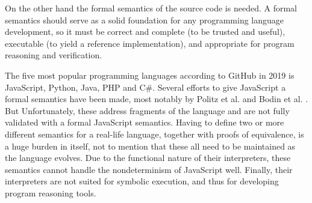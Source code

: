 \begin{multicols*}{2}
	On the other hand the formal semantics of the source code is needed.  A formal semantics should serve as a solid foundation for any programming language development, so it must be correct and complete (to be trusted and useful), executable (to yield a reference implementation), and appropriate for program reasoning and verification.
	
	The five most popular programming languages according to GitHub in 2019 is JavaScript, Python, Java, PHP and C\#. Several efforts to give JavaScript a formal semantics have been made, most notably by Politz et al. \cite{Politz} and Bodin et al. \cite{Bodin}. But Unfortunately, these address fragments of the language and are not fully validated with a formal JavaScript semantics. Having to define two or more different semantics for a real-life language, together with proofs of equivalence, is a huge burden in itself, not to mention that these all need to be maintained as the language evolves. Due to the functional nature of their interpreters, these semantics cannot handle the nondeterminism of JavaScript well. Finally, their interpreters are not suited for symbolic execution, and thus for developing program reasoning tools.
	
\end{multicols*}


